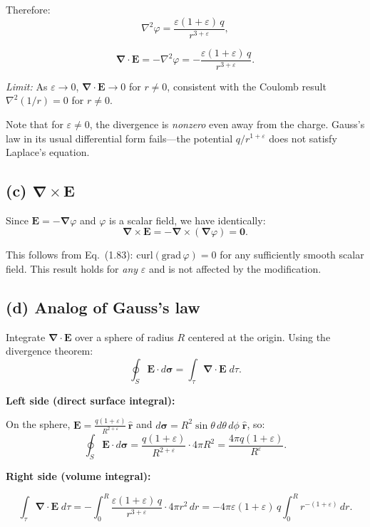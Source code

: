 \documentclass[12pt]{article}
\newcommand{\vect}[1]{\mathbf{#1}}
\newcommand{\grad}{\boldsymbol{\nabla}}
\begin{document}
Therefore:
\[
\nabla^2\varphi = \frac{\varepsilon(1+\varepsilon)\,q}{r^{3+\varepsilon}},
\]

\[
\boxed{\grad\cdot\vect{E} = -\nabla^2\varphi = -\frac{\varepsilon(1+\varepsilon)\,q}{r^{3+\varepsilon}}}.
\]

\textit{Limit:} As $\varepsilon \to 0$, $\grad\cdot\vect{E} \to 0$ for $r \neq 0$, consistent with the Coulomb result $\nabla^2(1/r) = 0$ for $r \neq 0$.

Note that for $\varepsilon \neq 0$, the divergence is \emph{nonzero} even away from the charge. Gauss's law in its usual differential form fails---the potential $q/r^{1+\varepsilon}$ does not satisfy Laplace's equation.

\subsection*{(c) $\grad\times\vect{E}$}

Since $\vect{E} = -\grad\varphi$ and $\varphi$ is a scalar field, we have identically:
\[
\boxed{\grad\times\vect{E} = -\grad\times(\grad\varphi) = \vect{0}}.
\]

This follows from Eq.~(1.83): $\text{curl}(\text{grad}\,\varphi) = 0$ for any sufficiently smooth scalar field. This result holds for \emph{any} $\varepsilon$ and is not affected by the modification.

\subsection*{(d) Analog of Gauss's law}

Integrate $\grad\cdot\vect{E}$ over a sphere of radius $R$ centered at the origin. Using the divergence theorem:
\[
\oint_S \vect{E}\cdot d\boldsymbol{\sigma} = \int_\tau \grad\cdot\vect{E}\;d\tau.
\]

\textbf{Left side (direct surface integral):}

On the sphere, $\vect{E} = \frac{q(1+\varepsilon)}{R^{2+\varepsilon}}\,\hat{\vect{r}}$ and $d\boldsymbol{\sigma} = R^2\sin\theta\,d\theta\,d\phi\;\hat{\vect{r}}$, so:
\[
\oint_S \vect{E}\cdot d\boldsymbol{\sigma} = \frac{q(1+\varepsilon)}{R^{2+\varepsilon}} \cdot 4\pi R^2 = \frac{4\pi q(1+\varepsilon)}{R^{\varepsilon}}.
\]

\textbf{Right side (volume integral):}

\[
\int_\tau \grad\cdot\vect{E}\;d\tau = -\int_0^R \frac{\varepsilon(1+\varepsilon)\,q}{r^{3+\varepsilon}} \cdot 4\pi r^2\,dr = -4\pi\varepsilon(1+\varepsilon)\,q \int_0^R r^{-(1+\varepsilon)}\,dr.
\]
\end{document}
